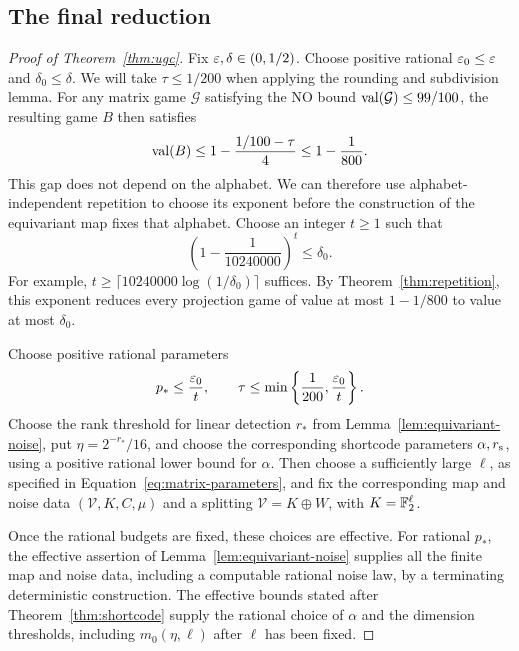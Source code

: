 \subsection{The final reduction}

\begin{proof}[Proof of Theorem~\ref{thm:ugc}]
Fix $\varepsilon,\delta\in(0,1/2)$.  Choose positive rational
$\varepsilon_0\le\varepsilon$ and $\delta_0\le\delta$.  We will take
$\tau\le1/200$ when applying the rounding and subdivision lemma.
For any matrix game $\mathcal G$ satisfying the NO bound
$\operatorname{val}(\mathcal G)\le99/100$, the resulting game $B$ then satisfies
\begin{equation}
 \operatorname{val}(B)\le1-\frac{1/100-\tau}{4}\le1-\frac1{800}.
 \label{eq:post-subdivision-gap}
\end{equation}
This gap does not depend on the alphabet.  We can therefore use
alphabet-independent repetition to choose its exponent before the
construction of the equivariant map fixes that alphabet.  Choose an integer $t\ge1$
such that
\begin{equation}
 \left(1-\frac1{10240000}\right)^t\le\delta_0.
 \label{eq:final-repetition-gap}
\end{equation}
For example, $t\ge\lceil10240000\log(1/\delta_0)\rceil$ suffices.
By Theorem~\ref{thm:repetition}, this exponent reduces every projection
game of value at most $1-1/800$ to value at most $\delta_0$.

Choose positive rational parameters
\begin{equation}
 p_*\le\frac{\varepsilon_0}{t},\qquad
 \tau\le\min\left\{\frac1{200},\frac{\varepsilon_0}{t}\right\}.
 \label{eq:final-errors}
\end{equation}
Choose the rank threshold for linear detection $r_*$ from Lemma~\ref{lem:equivariant-noise},
put $\eta=2^{-r_*}/16$, and choose the corresponding shortcode
parameters $\alpha,r_{\rm s}$, using a positive rational lower bound
for $\alpha$.  Then choose a sufficiently large $\ell$, as specified
in Equation~\eqref{eq:matrix-parameters}, and fix the corresponding
map and noise data $(\mathcal V,K,C,\mu)$ and a splitting
$\mathcal V=K\oplus W$, with $K=\mathbb F_2^\ell$.

Once the rational budgets are fixed, these choices are effective.
For rational $p_*$, the effective assertion of Lemma~\ref{lem:equivariant-noise}
supplies all the finite map and noise data, including a computable rational
noise law, by a terminating deterministic construction.  The effective bounds stated after
Theorem~\ref{thm:shortcode} supply the rational choice of $\alpha$ and
the dimension thresholds, including $m_0(\eta,\ell)$ after $\ell$ has
been fixed.


\end{proof}
